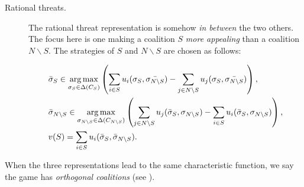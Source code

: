 \begin{description}
	\item[Rational threats.] The rational threat representation is somehow \emph{in between} the two others. The focus here is one making a coalition $S$ \emph{more appealing} than a coalition $N \backslash S$.
	The strategies of $S$ and $N \backslash S$ are chosen as follows:

	\begin{align}
 &	\bar{\sigma}_S \in \operatorname*{arg\,max}_{\sigma_S \in \Delta(C_S)} \left ( \sum_{i \in S} u_i (\sigma_S, \bar{\sigma_{N \backslash S}}) -  \sum_{j \in N\backslash S} u_j (\sigma_S, \bar{\sigma_{N \backslash S}})  \right ), \label{eq1RT}\\
 &	\bar{\sigma}_{N \backslash S} \in \operatorname*{arg\,max}_{\sigma_{N \backslash S} \in \Delta(C_{N \backslash S})} \left ( \sum_{j \in {N \backslash S}} u_j (\bar{\sigma}_S, {\sigma_{N \backslash S}}) -  \sum_{i \in S} u_i (\bar{\sigma}_S, {\sigma_{N \backslash S}})  \right ), \label{eq2RT} \\
 & v(S) = \sum_{i \in S} u_i(\bar{\sigma}_S, \bar{\sigma}_{N \backslash S}).
	\end{align}

\end{description}
When the three representations lead to the same characteristic function, we say the game has \emph{orthogonal coalitions} (see \cite[p. 426]{MyGTAO}).
